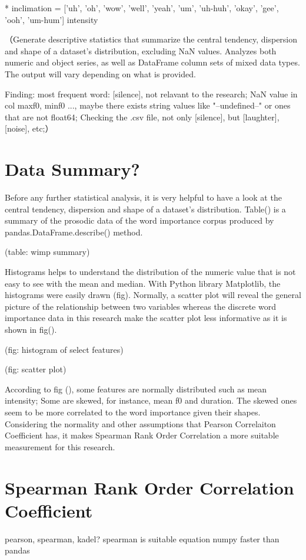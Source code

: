 * inclimation = ['uh', 'oh', 'wow', 'well', 'yeah', 'um', 'uh-huh', 'okay', 'gee', 'ooh', 'um-hum']
intensity


（Generate descriptive statistics that summarize the central tendency, dispersion and shape of a dataset's distribution, excluding NaN values.
Analyzes both numeric and object series, as well as DataFrame column sets of mixed data types. The output will vary depending on what is provided.

Finding:
most frequent word: [silence], not relavant to the research;
NaN value in col maxf0, minf0 ..., maybe there exists string values like "--undefined--" or ones that are not float64;
Checking the .csv file, not only [silence], but [laughter], [noise], etc;）





\section{Data Summary?}
Before any further statistical analysis, it is very helpful to have a look at the central tendency, dispersion and shape of a dataset's distribution. Table() is a summary of the prosodic data of the word importance corpus produced by pandas.DataFrame.describe() method.

(table: wimp summary)

Histograms helps to understand the distribution of the numeric value that is not easy to see with the mean and median. With Python library Matplotlib, the histograms were easily drawn (fig). Normally, a scatter plot will reveal the general picture of the relationship between two variables whereas the discrete word importance data in this research make the scatter plot less informative as it is shown in fig().

(fig: histogram of select features)

(fig: scatter plot)

According to fig (), some features are normally distributed such as  mean intensity; Some are skewed, for instance, mean f0 and duration. The skewed ones seem to be more correlated to the word importance given their shapes. Considering the normality and other assumptions that Pearson Correlaiton Coefficient has, it makes Spearman Rank Order Correlation a more suitable measurement for this research.

\section{Spearman Rank Order Correlation Coefficient}
pearson, spearman, kadel?
spearman is suitable
equation
numpy faster than pandas



